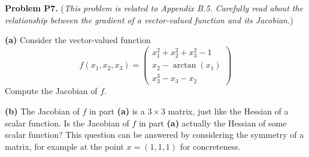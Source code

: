 \documentclass[12pt]{amsart}
\newcommand{\prob}[1]{\bigskip\noindent\textbf{#1}\quad }
\newcommand{\epart}[1]{\medskip\noindent\textbf{(#1)}\quad }
\begin{document}
\clearpage \newpage
\prob{Problem P7.}  (\emph{This problem is related to Appendix B.5.  Carefully read about the relationship between the gradient of a vector-valued function and its Jacobian.})

\epart{a}  Consider the vector-valued function
    $$f(x_1,x_2,x_3) = \begin{pmatrix}  x_1^2 + x_2^2 + x_3^2 - 1 \\
                                        x_2 - \arctan(x_1) \\
                                        x_3^3 - x_3 - x_2 \end{pmatrix}$$
Compute the Jacobian of $f$.

\epart{b}  The Jacobian of $f$ in part \textbf{(a)} is a $3 \times 3$ matrix, just like the Hessian of a scalar function.  Is the Jacobian of $f$ in part \textbf{(a)} actually the Hessian of some scalar function?  This question can be answered by considering the symmetry of a matrix, for example at the point $x=(1,1,1)$ for concreteness.
\end{document}
